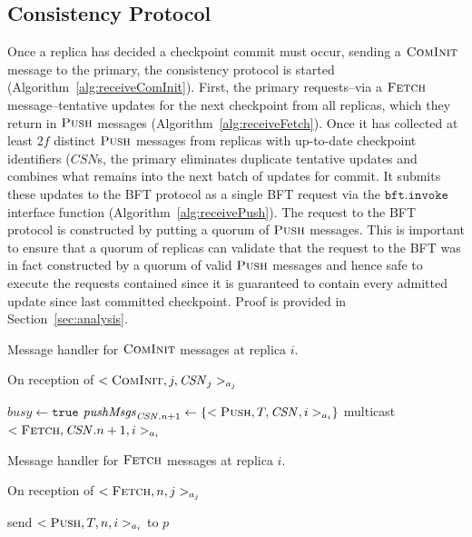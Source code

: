 \documentclass[twocolumn,10pt]{article}
\begin{document}
{\subsection{Consistency Protocol}
Once a replica has decided a checkpoint commit must occur, sending a
$\textsc{ComInit}$ message to the primary, the consistency protocol is
started (Algorithm~\ref{alg:receiveComInit}).  First, the primary requests--via a $\textsc{Fetch}$
message--tentative updates for the next checkpoint from all replicas,
which they return in $\textsc{Push}$ messages (Algorithm~\ref{alg:receiveFetch}).
Once it has collected at least $2f$ distinct $\textsc{Push}$ messages from
replicas with up-to-date checkpoint identifiers ($\mathit{CSN}$s, the
primary  eliminates duplicate tentative updates and combines what
remains into the next batch of updates for commit.  It submits
these updates to the BFT protocol as a single BFT request via the
$\mathtt{bft.invoke}$ interface function (Algorithm~\ref{alg:receivePush}).
The request to the BFT protocol is constructed by putting a quorum of 
$\textsc{Push}$ messages. This is important to ensure that a quorum of replicas
can validate that the request to the BFT was in fact constructed by a 
quorum of valid $\textsc{Push}$ messages and hence safe to execute the requests
contained since it is guaranteed to contain every admitted update since last
committed checkpoint. Proof is provided in Section~\ref{sec:analysis}.

\begin{algorithm}
\small
\caption{Message handler for $\textsc{ComInit}$ messages at replica $i$.}
On reception of $<\textsc{ComInit}, j, \mathit{CSN}_j>_{a_j}$
\begin{algorithmic}[1]\label{alg:receiveComInit}
\STATE $\mathit{busy} \leftarrow \mathtt{true}$
\STATE $\mathit{pushMsgs}_{\mathit{CSN}.n+1} \leftarrow
\{<\textsc{Push}, T, \mathit{CSN}, i>_{a_i}\}$
\STATE multicast $<\textsc{Fetch}, \mathit{CSN}.n + 1, i>_{a_i}$
\ENDIF
\end{algorithmic}
\end{algorithm}


\begin{algorithm}
\small
\caption{Message handler for $\textsc{Fetch}$ messages at replica $i$.}
On reception of $<\textsc{Fetch}, n, j>_{a_j}$
\begin{algorithmic}[1]\label{alg:receiveFetch}
\STATE send $<\textsc{Push}, T, n, i>_{a_i}$ to $p$
\ENDIF
\end{algorithmic}
\end{algorithm}


}
\end{document}
